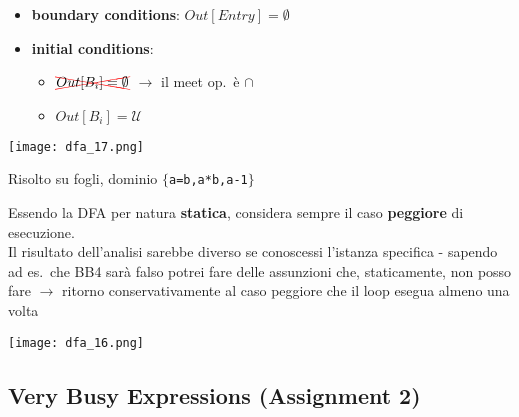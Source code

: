 \noindent\begin{minipage}[c]{.5\textwidth}
  \begin{itemize}
    \item \textbf{boundary conditions}: $Out[Entry] = \emptyset$
    \item \textbf{initial conditions}:
      \begin{itemize}
        \item $\textcolor{red}{\xcancel{\textcolor{black}{Out[B_{i}] = \emptyset}}}$ $\rightarrow$ il meet op.~\`e $\cap$
        \item $Out[B_{i}] = \mathcal{U}$
      \end{itemize}
  \end{itemize}
\end{minipage}\hfill
\begin{minipage}[c]{.4\textwidth}
  \texttt{[image: dfa\_17.png]}
\end{minipage}

\begin{example}
  \noindent\begin{minipage}[c]{.65\textwidth}
    Risolto su fogli, dominio $\lbrace$\lstinline|a=b,a*b,a-1|$\rbrace$
    \begin{emphasize}
      Essendo la DFA per natura \textbf{statica}, considera sempre il caso \textbf{peggiore} di esecuzione.\\
      Il risultato dell'analisi sarebbe diverso se conoscessi l'istanza specifica - sapendo ad es.~che BB4 sar\`a falso potrei fare delle assunzioni che, staticamente, non posso fare $\rightarrow$ ritorno conservativamente al caso peggiore che il loop esegua almeno una volta
    \end{emphasize}
  \end{minipage}\hfill
  \begin{minipage}[c]{.3\textwidth}
    \texttt{[image: dfa\_16.png]}
  \end{minipage}
\end{example}

\subsection{Very Busy Expressions (Assignment 2)}

